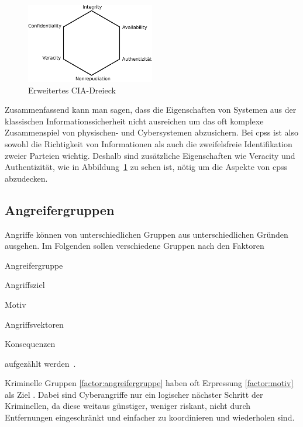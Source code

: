 \documentclass[final,bibliography=totocnumbered]{include/sikseminar}
\newcommand{\cps}{\glspl{cps}\xspace}
\begin{document}
\begin{figure}
    \centering
    \includegraphics[width=0.5\textwidth]{triad}
    \caption{Erweitertes CIA-Dreieck}
    \label{fig:triad}
\end{figure}

Zusammenfassend kann man sagen, dass die Eigenschaften von Systemen aus der klassischen Informationssicherheit nicht ausreichen um das oft komplexe Zusammenspiel von physischen- und Cybersystemen abzusichern.
Bei \cps ist also sowohl die Richtigkeit von Informationen als auch die zweifelsfreie Identifikation zweier Parteien wichtig.
Deshalb sind zusätzliche Eigenschaften wie Veracity und Authentizität, wie in Abbildung~\ref{fig:triad} zu sehen ist, nötig um die Aspekte von \cps abzudecken.


\subsection{Angreifergruppen}\label{subsec:angreifergruppen}

Angriffe können von unterschiedlichen Gruppen aus unterschiedlichen Gründen ausgehen.
Im Folgenden sollen verschiedene Gruppen nach den Faktoren
\begin{enumerate*}[label=(\alph*),before=\unskip{: }, itemjoin={{; }}, itemjoin*={{, und }}]
    \item Angreifergruppe\label{factor:angreifergruppe}
    \item Angriffsziel\label{factor:target}
    \item Motiv\label{factor:motiv}
    \item Angriffsvektoren\label{factor:methode}
    \item Konsequenzen\label{factor:konsequenz}
\end{enumerate*} aufgezählt werden~\cite{HLL+17}.

Kriminelle Gruppen \ref{factor:angreifergruppe} haben oft Erpressung \ref{factor:motiv} als Ziel \cite{WYX+10}.
Dabei sind Cyberangriffe nur ein logischer nächster Schritt der Kriminellen, da diese weitaus günstiger, weniger riskant, nicht durch Entfernungen eingeschränkt und einfacher zu koordinieren und wiederholen sind. \cite{CAS+09}
\end{document}
